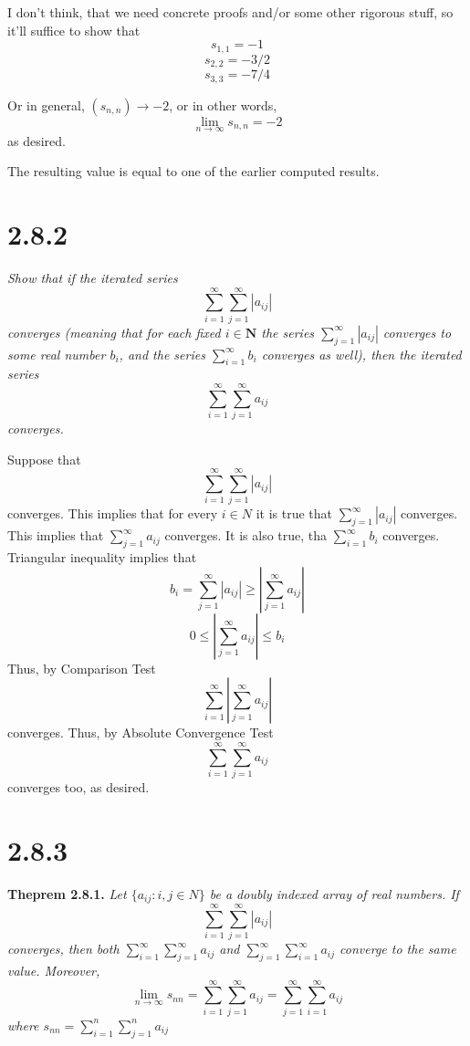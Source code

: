 \documentclass[11pt,oneside,titlepage]{book}
\begin{document}
I don't think, that we need concrete proofs and/or some other rigorous stuff,
so it'll suffice to show that
$$s_{1,1} = -1$$
$$s_{2,2} = -3/2$$
$$s_{3,3} = -7/4$$

Or in general, $(s_{n,n}) \to  -2$, or in other words,
$$\lim_{n \to \infty} s_{n,n} = -2$$
as desired.

The resulting value is equal to one of the earlier computed results.

\section*{2.8.2}

\textit{Show that if the iterated series }
$$\sum_{i = 1}^{\infty}\sum_{j = 1}^{\infty}|a_{ij}|$$
\textit{converges (meaning that for each fixed $i \in \textbf{N}$ the series
  $\sum_{j = 1}^{\infty}|a_{ij}|$ converges to some real number $b_i$, and
  the series $\sum_{i = 1}^{\infty}b_i$ converges as well), then the iterated
  series}
$$\sum_{i = 1}^{\infty}\sum_{j = 1}^{\infty}a_{ij}$$
\textit{converges.}

Suppose that
$$\sum_{i = 1}^{\infty}\sum_{j = 1}^{\infty}|a_{ij}|$$
converges. This implies that for every $i \in N$ it is true that
$\sum_{j = 1}^{\infty}|a_{ij}|$  converges. This implies that
$\sum_{j = 1}^{\infty}a_{ij}$ converges. It is also true, tha
$\sum_{i = 1}^{\infty}b_{i}$ converges. Triangular inequality implies that
$$ b_i =  \sum_{j = 1}^{\infty}|a_{ij}| \geq \left|\sum_{j = 1}^{\infty}a_{ij}\right|$$
$$  0 \leq \left|\sum_{j = 1}^{\infty}a_{ij}\right| \leq b_i$$
Thus, by Comparison Test
$$\sum_{i = 1}^{\infty}\left|\sum_{j = 1}^{\infty}a_{ij}\right|$$
converges. Thus, by Absolute Convergence Test
$$\sum_{i = 1}^{\infty}\sum_{j = 1}^{\infty}a_{ij}$$
converges too, as desired.



\section*{2.8.3}

\textbf{Theprem 2.8.1.}
\textit{Let $\{a_{ij}: i, j \in N\}$ be a doubly indexed array of real numbers.
If}
$$\sum_{i = 1}^{\infty}\sum_{j = 1}^{\infty}|a_{ij}|$$
\textit{converges, then both
  $\sum_{i = 1}^{\infty}\sum_{j = 1}^{\infty} a_{ij}$ and
  $\sum_{j = 1}^{\infty}\sum_{i = 1}^{\infty} a_{ij}$ converge to the same value. Moreover, }
$$\lim_{n \to \infty} s_{nn} = \sum_{i = 1}^{\infty}\sum_{j = 1}^{\infty}a_{ij} = \sum_{j = 1}^{\infty}\sum_{i = 1}^{\infty}a_{ij}$$
\textit{where $s_{nn} = \sum_{i = 1}^{n}\sum_{j = 1}^{n}a_{ij}$}
\end{document}
